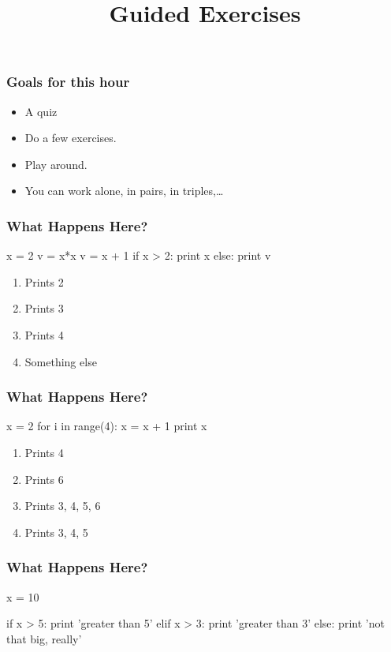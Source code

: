 
\title{Guided Exercises}

\frame{\maketitle}

\begin{frame}
\frametitle{Goals for this hour}

\begin{itemize}
\item A quiz
\item Do a few exercises.
\item Play around.
\item You can work alone, in pairs, in triples,\ldots
\end{itemize}

\end{frame}

\begin{frame}[fragile]
\frametitle{What Happens Here?}
\begin{python}
x = 2
v = x*x
v = x + 1
if x > 2:
    print x
else:
    print v
\end{python}

\begin{enumerate}
\item Prints \alert{2}
\item Prints \alert{3}
\item Prints \alert{4}
\item Something else
\end{enumerate}

\end{frame}

\begin{frame}[fragile]
\frametitle{What Happens Here?}
\begin{python}
x = 2
for i in range(4):
    x = x + 1
print x
\end{python}

\begin{enumerate}
\item Prints \alert{4}
\item Prints \alert{6}
\item Prints \alert{3}, \alert{4}, \alert{5}, \alert{6}
\item Prints \alert{3}, \alert{4}, \alert{5}
\end{enumerate}

\end{frame}

\begin{frame}[fragile]
\frametitle{What Happens Here?}

\begin{python}
x = 10

if x > 5:
    print 'greater than 5'
elif x > 3:
    print 'greater than 3'
else:
    print 'not that big, really'
\end{python}

\end{frame}



